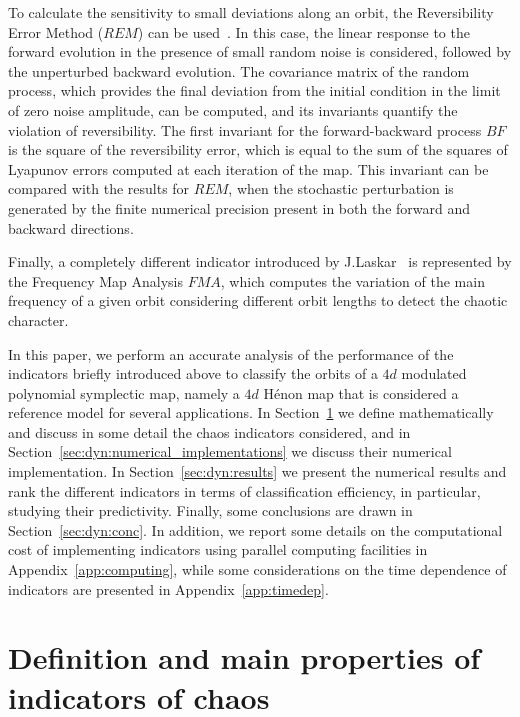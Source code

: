 To calculate the sensitivity to small deviations along an orbit, the Reversibility Error Method ($REM$) can be used~\cite{Panichi2016,Panichi2017}. In this case, the linear response to the forward evolution in the presence of small random noise is considered, followed by the unperturbed backward evolution. The covariance matrix of the random process, which provides the final deviation from the initial condition in the limit of zero noise amplitude, can be computed, and its invariants quantify the violation of reversibility. The first invariant for the forward-backward process $BF$ is the square of the reversibility error, which is equal to the sum of the squares of Lyapunov errors computed at each iteration of the map. This invariant can be compared with the results for $REM$, when the stochastic perturbation is generated by the finite numerical precision present in both the forward and backward directions. 

Finally, a completely different indicator introduced by J.Laskar~\cite{Laskar1999,Laskar2003} is represented by the Frequency Map Analysis $FMA$, which computes the variation of the main frequency of a given orbit considering different orbit lengths to detect the chaotic character. 

In this paper, we perform an accurate analysis of the performance of the indicators briefly introduced above to classify the orbits of a $4d$ modulated polynomial symplectic map, namely a $4d$ H\'enon map that is considered a reference model for several applications. In Section~\ref{sec:dyn:review} we define mathematically and discuss in some detail the chaos indicators considered, and in Section~\ref{sec:dyn:numerical_implementations} we discuss their numerical implementation. In Section~\ref{sec:dyn:results} we present the numerical results and rank the different indicators in terms of classification efficiency, in particular, studying their predictivity. Finally, some conclusions are drawn in Section~\ref{sec:dyn:conc}. In addition, we report some details on the computational cost of implementing indicators using parallel computing facilities in Appendix~\ref{app:computing}, while some considerations on the time dependence of indicators are presented in Appendix~\ref{app:timedep}. 
%
\section{Definition and main properties of indicators of chaos} \label{sec:dyn:review}
%
